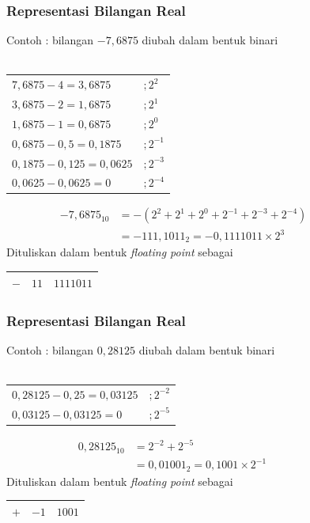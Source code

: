 \documentclass{beamer}
\begin{document}
\begin{frame}
\frametitle{Representasi Bilangan Real}
Contoh : bilangan $-7,6875$ diubah dalam bentuk binari\\\ \\
\begin{tabular}{ll}
$7,6875 - \boxed{4} = 3,6875 $&$;2^{2}$
\\$3,6875 - \boxed{2} = 1,6875 $&$;2^{1}$
\\$1,6875 - \boxed{1} = 0,6875 $&$;2^{0}$
\\$0,6875 - \boxed{0,5} = 0,1875 $&$;2^{-1}$
\\$0,1875 - \boxed{0,125} = 0,0625 $&$;2^{-3}$
\\$0,0625 - \boxed{0,0625} = 0 $&$;2^{-4}$
\end{tabular}
\begin{equation}
\begin{split}
-7,6875_{10}&=-(2^2+2^1+2^0+2^{-1}+2^{-3}+2^{-4})
\\&= -111,1011_2 = -0,1111011 \times 2^3 \qquad \qquad \qquad
\end{split}
\nonumber
\end{equation}
Dituliskan dalam bentuk \textit{floating point} sebagai
\begin{center}
\begin{tabular}{|c|c|c|}
\hline
	$-$ & $11$ & $1111011$\\
\hline
\end{tabular}
\end{center}
\end{frame}


\begin{frame}
\frametitle{Representasi Bilangan Real}
Contoh : bilangan $0,28125$ diubah dalam bentuk binari\\\ \\
\begin{tabular}{ll}
$0,28125 - \boxed{0,25} = 0,03125 $&$;2^{-2}$
\\$0,03125 - \boxed{0,03125} = 0 $&$;2^{-5}$
\end{tabular}
\begin{equation}
\begin{split}
0,28125_{10}&=2^{-2}+2^{-5}
\\&= 0,01001_2 = 0,1001 \times 2^{-1} \qquad \qquad \qquad
\end{split}
\nonumber
\end{equation}
Dituliskan dalam bentuk \textit{floating point} sebagai
\begin{center}
\begin{tabular}{|c|c|c|}
\hline
	$+$ & $-1$ & $1001$\\
\hline
\end{tabular}
\end{center}
\end{frame}
\end{document}
